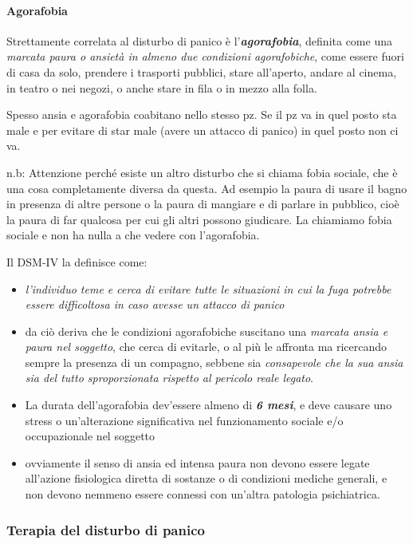 \paragraph{Agorafobia}

Strettamente correlata al disturbo di panico è
l'\textbf{\emph{agorafobia}}, definita come una \emph{marcata paura o
ansietà in almeno due condizioni agorafobiche}, come essere fuori di
casa da solo, prendere i trasporti pubblici, stare all'aperto, andare al
cinema, in teatro o nei negozi, o anche stare in fila o in mezzo alla
folla.

Spesso ansia e agorafobia coabitano nello stesso pz. Se il pz va in quel
posto sta male e per evitare di star male (avere un attacco di panico)
in quel posto non ci va.

n.b: Attenzione perché esiste un altro disturbo che si chiama fobia
sociale, che è una cosa completamente diversa da questa. Ad esempio la
paura di usare il bagno in presenza di altre persone o la paura di
mangiare e di parlare in pubblico, cioè la paura di far qualcosa per cui
gli altri possono giudicare. La chiamiamo fobia sociale e non ha nulla a
che vedere con l'agorafobia.

Il DSM-IV la definisce come:

\begin{itemize}
\item
  \emph{l'individuo teme e cerca di evitare tutte le situazioni in cui
  la fuga potrebbe essere difficoltosa in caso avesse un attacco di
  panico}
\item
  da ciò deriva che le condizioni agorafobiche suscitano una
  \emph{marcata ansia e paura nel soggetto}, che cerca di evitarle, o al
  più le affronta ma ricercando sempre la presenza di un compagno,
  sebbene sia \emph{consapevole che la sua ansia sia del tutto
  sproporzionata rispetto al pericolo reale legato}.
\item
  La durata dell'agorafobia dev'essere almeno di \textbf{\emph{6 mesi}},
  e deve causare uno stress o un'alterazione significativa nel
  funzionamento sociale e/o occupazionale nel soggetto
\item
  ovviamente il senso di ansia ed intensa paura non devono essere legate
  all'azione fisiologica diretta di sostanze o di condizioni mediche
  generali, e non devono nemmeno essere connessi con un'altra patologia
  psichiatrica.
  \end{itemize}
 
\subsubsection{Terapia del disturbo di panico}

